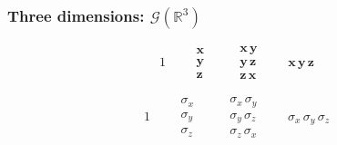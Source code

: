 \documentclass[12pt,xcolor={dvipsnames}]{beamer}
\renewcommand{\vec}{\bm}
\renewcommand{\G}{\mathcal{G}}
\begin{document}
\begin{frame}
  \frametitle{Three dimensions: $\G(\mathbb{R}^{3})$}
  \begin{equation*}
    1
    \qquad
    \begin{matrix}
      \vec{x} \\ \vec{y} \\ \vec{z}
    \end{matrix}
    \qquad
    \begin{matrix}
      \vec{x}\,\vec{y} \\ \vec{y}\, \vec{z} \\ \vec{z}\, \vec{x}
    \end{matrix}
    \qquad
    \vec{x}\, \vec{y}\, \vec{z}
  \end{equation*}
  \pause

  \begin{equation*}
    1
    \qquad
    \begin{matrix}
      \sigma_{x} \\ \sigma_{y} \\ \sigma_{z}
    \end{matrix}
    \qquad
    \begin{matrix}
      \sigma_{x}\,\sigma_{y} \\ \sigma_{y}\, \sigma_{z} \\
      \sigma_{z}\, \sigma_{x}
    \end{matrix}
    \qquad
    \sigma_{x}\, \sigma_{y}\, \sigma_{z}
  \end{equation*}
\end{frame}
\end{document}
